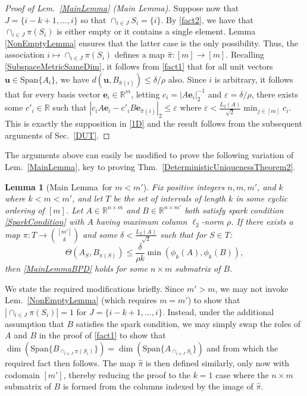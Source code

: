 \documentclass[journal, twocolumn]{IEEEtran}
\newtheorem{lemma}{Lemma}
\begin{document}
\begin{proof}[Proof of Lem.~\ref{MainLemma} (Main Lemma)]
Suppose now that $J = \{i-k+1, \ldots, i\}$ so that \mbox{$\cap_{i \in J} S_i = \{i\}$}. By \eqref{fact2}, we have that $\cap_{i \in J} \pi(S_i)$ is either empty or it contains a single element. Lemma \ref{NonEmptyLemma} ensures that the latter case is the only possibility. Thus, the association $i \mapsto \cap_{i \in J} \pi(S_i)$ defines a map $\hat \pi: [m] \to [m]$. Recalling \eqref{SubspaceMetricSameDim}, it follows from \eqref{fact1} that for all unit vectors $\mathbf{u} \in \text{Span}\{A_i\}$, we have $d\left( \mathbf{u}, B_{\hat \pi(i)}\right) \leq \delta/\rho$ also. Since $i$ is arbitrary, it follows that for every basis vector $\mathbf{e}_i \in \mathbb{R}^m$, letting $c_i = |A\mathbf{e}_i|_2^{-1}$ and $\varepsilon = \delta/\rho$, there exists some $c'_i \in \mathbb{R}$ such that $|c_iA\mathbf{e}_i - c'_iB\mathbf{e}_{\hat \pi(i)}|_2 \leq \varepsilon$ where $\varepsilon < \frac{L_2(A)}{\sqrt{2}} \min_{j \in [m]} c_i$. This is exactly the supposition in \eqref{1D} and the result follows from the subsequent arguments of Sec.~\ref{DUT}. 
\end{proof}

The arguments above can easily be modified to prove the following variation of Lem.~\ref{MainLemma}, key to proving Thm.~\ref{DeterministicUniquenessTheorem2}.

\begin{lemma}[Main Lemma~for $m < m'$]\label{MainLemma2}
Fix positive integers $n, m, m'$, and $k$ where $k < m < m'$, and let $T$ be the set of intervals of length $k$ in some cyclic ordering of $[m]$. Let $A \in \mathbb{R}^{n \times m}$ and $B \in \mathbb{R}^{n \times m'}$ both satisfy spark condition \eqref{SparkCondition} with $A$ having maximum column $\ell_2$-norm $\rho$. If there exists a map $\pi: T \to {[m'] \choose k}$ and some $\delta < \frac{L_{2}(A)}{\sqrt{2}}$ such that for $S \in T$:
\begin{equation}\label{GapUpperBound2}
\Theta(A_{S}, B_{\pi(S)}) \leq \frac{ \delta }{\rho k} \min(\phi_k(A), \phi_k(B)),
\end{equation}
then \eqref{MainLemmaBPD} holds for some $n \times m$ submatrix of $B$. 
\end{lemma}

We state the required modifications briefly. Since $m' > m$, we may not invoke Lem.~\ref{NonEmptyLemma} (which requires $m = m'$) to show that $|\cap_{i \in J} \pi(S_i)| = 1$ for $J = \{i-k+1, \ldots, i\}$. Instead, under the additional assumption that $B$ satisfies the spark condition, we may simply swap the roles of $A$ and $B$ in the proof of \eqref{fact1} to show that $\dim(\text{Span}\{B_{\cap_{i \in J}\pi(S_i)}\}) = \dim(\text{Span}\{A_{\cap_{i \in J} S_i}\})$ and from which the required fact then follows. The map $\hat \pi$ is then defined similarly, only now with codomain $[m']$, thereby reducing the proof to the $k=1$ case where the $n \times m$ submatrix of $B$ is formed from the columns indexed by the image of $\hat \pi$. 
\end{document}
